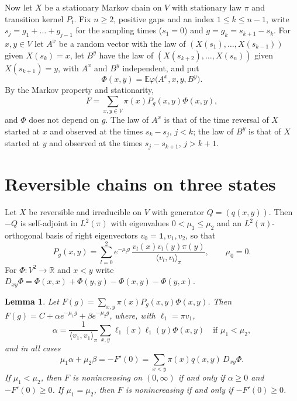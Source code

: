 \documentclass[11pt]{amsart}
\newtheorem{lemma}[theorem]{Lemma}
\theoremstyle{remark}
\numberwithin{equation}{section}
\newcommand{\E}{\mathbb E}
\newcommand{\R}{\mathbb R}
\newcommand{\1}{\mathbf 1}
\begin{document}
Now let $X$ be a stationary Markov chain on $V$ with stationary law $\pi$ and transition kernel $P_t$. Fix $n\ge2$, positive gaps and an index $1\le k\le n-1$, write $s_j=g_1+\dots+g_{j-1}$ for the sampling times ($s_1=0$) and $g=g_k=s_{k+1}-s_k$. For $x,y\in V$ let $A^x$ be a random vector with the law of $(X(s_1),\dots,X(s_{k-1}))$ given $X(s_k)=x$, let $B^y$ have the law of $(X(s_{k+2}),\dots,X(s_n))$ given $X(s_{k+1})=y$, with $A^x$ and $B^y$ independent, and put
\begin{equation}\label{eq:Phi}
\Phi(x,y)=\E\varphi\bigl(A^x,x,y,B^y\bigr).
\end{equation}
By the Markov property and stationarity,
\begin{equation}\label{eq:onegap}
F=\sum_{x,y\in V}\pi(x)P_g(x,y)\Phi(x,y),
\end{equation}
and $\Phi$ does not depend on $g$. The law of $A^x$ is that of the time reversal of $X$ started at $x$ and observed at the times $s_k-s_j$, $j<k$; the law of $B^y$ is that of $X$ started at $y$ and observed at the times $s_j-s_{k+1}$, $j>k+1$.

\section{Reversible chains on three states}\label{sec:three}

Let $X$ be reversible and irreducible on $V$ with generator $Q=(q(x,y))$. Then $-Q$ is self-adjoint in $L^2(\pi)$ with eigenvalues $0<\mu_1\le\mu_2$ and an $L^2(\pi)$-orthogonal basis of right eigenvectors $v_0=\1,v_1,v_2$, so that
\begin{equation}\label{eq:spec}
P_g(x,y)=\sum_{l=0}^2e^{-\mu_lg}\,\frac{v_l(x)v_l(y)\pi(y)}{\langle v_l,v_l\rangle_\pi},\qquad\mu_0=0.
\end{equation}
For $\Phi\colon V^2\to\R$ and $x<y$ write $D_{xy}\Phi=\Phi(x,x)+\Phi(y,y)-\Phi(x,y)-\Phi(y,x)$.

\begin{lemma}\label{lem:spectral}
Let $F(g)=\sum_{x,y}\pi(x)P_g(x,y)\Phi(x,y)$. Then $F(g)=C+\alpha e^{-\mu_1g}+\beta e^{-\mu_2g}$, where, with $\ell_1=\pi v_1$,
\begin{equation}\label{eq:alpha}
\alpha=\frac{1}{\langle v_1,v_1\rangle_\pi}\sum_{x,y}\ell_1(x)\ell_1(y)\Phi(x,y)\quad\text{if }\mu_1<\mu_2,
\end{equation}
and in all cases
\begin{equation}\label{eq:F0}
\mu_1\alpha+\mu_2\beta=-F'(0)=\sum_{x<y}\pi(x)q(x,y)\,D_{xy}\Phi.
\end{equation}
If $\mu_1<\mu_2$, then $F$ is nonincreasing on $(0,\infty)$ if and only if $\alpha\ge0$ and $-F'(0)\ge0$. If $\mu_1=\mu_2$, then $F$ is nonincreasing if and only if $-F'(0)\ge0$.
\end{lemma}
\end{document}
